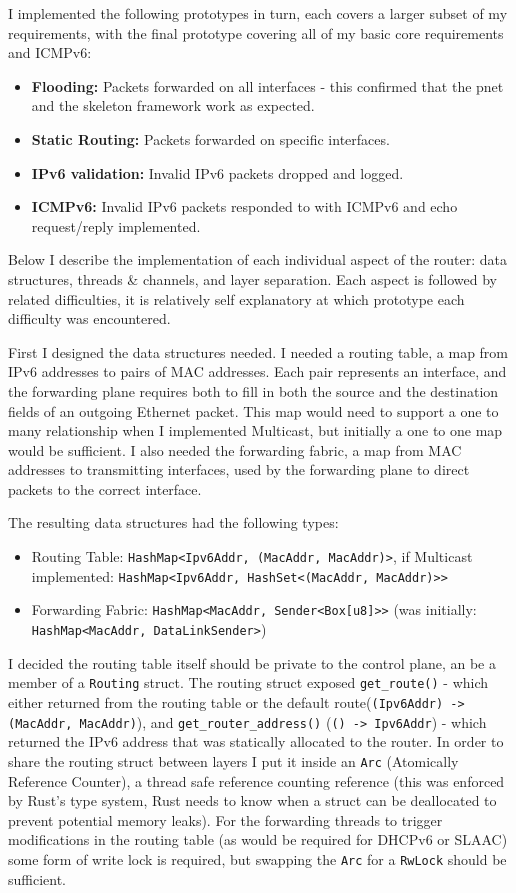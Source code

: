 \documentclass[12pt,a4paper,twoside,openany]{report}
\begin{document}
\bigskip

I implemented the following prototypes in turn, each covers a larger subset of my requirements, with the final prototype covering all of my basic core requirements and ICMPv6:
\begin{itemize}
\item \textbf{Flooding:} Packets forwarded on all interfaces - this confirmed that the pnet and the skeleton framework work as expected.
\item \textbf{Static Routing:} Packets forwarded on specific interfaces.
\item \textbf{IPv6 validation:} Invalid IPv6 packets dropped and logged.
\item \textbf{ICMPv6:} Invalid IPv6 packets responded to with ICMPv6 and echo request/reply implemented.
\end{itemize}
Below I describe the implementation of each individual aspect of the router: data structures, threads \& channels, and layer separation.  Each aspect is followed by related difficulties, it is relatively self explanatory at which prototype each difficulty was encountered.

\bigskip

First I designed the data structures needed.  I needed a routing table, a map from IPv6 addresses to pairs of MAC addresses. Each pair represents an interface, and the forwarding plane requires both to fill in both the source and the destination fields of an outgoing Ethernet packet.  This map would need to support a one to many relationship when I implemented Multicast, but initially a one to one map would be sufficient.  I also needed the forwarding fabric, a map from MAC addresses to transmitting interfaces, used by the forwarding plane to direct packets to the correct interface.

The resulting data structures had the following types:
\begin{itemize}
\item Routing Table: \verb!HashMap<Ipv6Addr, (MacAddr, MacAddr)>!, if Multicast implemented: \verb!HashMap<Ipv6Addr, HashSet<(MacAddr, MacAddr)>>!
\item Forwarding Fabric: \verb!HashMap<MacAddr, Sender<Box[u8]>>! (was initially: \verb!HashMap<MacAddr, DataLinkSender>!)
\end{itemize}
I decided the routing table itself should be private to the control plane, an be a member of a \verb!Routing! struct.  The routing struct exposed \verb!get_route()! - which either returned from the routing table or the default route(\verb!(Ipv6Addr) -> (MacAddr, MacAddr)!), and \verb!get_router_address()! (\verb!() -> Ipv6Addr!) - which returned the IPv6 address that was statically allocated to the router. In order to share the routing struct between layers I put it inside an \verb!Arc! (Atomically Reference Counter\cite{rust_arc}), a thread safe reference counting reference (this was enforced by Rust's type system, Rust needs to know when a struct can be deallocated to prevent potential memory leaks).  For the forwarding threads to trigger modifications in the routing table (as would be required for DHCPv6 or SLAAC) some form of write lock is required, but swapping the \verb!Arc! for a \verb!RwLock!\cite{rust_rwlock} should be sufficient.
\end{document}
